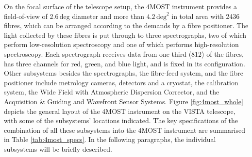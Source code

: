 \documentclass[a4paper,11pt]{article}
\begin{document}
On the focal surface of the telescope setup, the 4MOST instrument provides a field-of-view of 2.6\,deg diameter and more than $4.2\,\mathrm{deg}^2$ in total area with 2436 fibres, which can be arranged according to the demands by a fibre positioner. The light collected by these fibres is put through to three spectrographs, two of which perform low-resolution spectroscopy and one of which performs high-resolution spectroscopy. Each spectrograph receives data from one third (812) of the fibres, has three channels for red, green, and blue light, and is fixed in its configuration. Other subsystems besides the spectrographs, the fibre-feed system, and the fibre positioner include metrology cameras, detectors and a cryostat, the calibration system, the Wide Field with Atmospheric Dispersion Corrector, and the Acquisition \& Guiding and Wavefront Sensor Systems. Figure \ref{fig:4most_whole} depicts the general layout of the 4MOST instrument on the VISTA telescope, with some of the subsystems' locations indicated. The key specifications of the combination of all these subsystems into the 4MOST instrument are summarised in Table \ref{tab:4most_specs}. In the following paragraphs, the individual subsystems will be briefly described.
%
\end{document}
